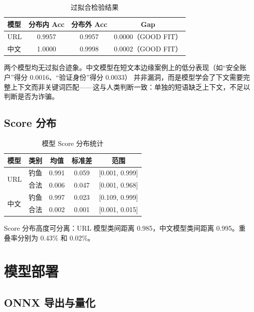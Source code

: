 \documentclass[11pt,a4paper]{article}
\begin{document}
\begin{table}[h]
\centering
\caption{过拟合检验结果}
\begin{tabular}{lccc}
\toprule
模型 & 分布内 Acc & 分布外 Acc & Gap \\
\midrule
URL & 0.9957 & 0.9957 & 0.0000（GOOD FIT） \\
中文 & 1.0000 & 0.9998 & 0.0002（GOOD FIT） \\
\bottomrule
\end{tabular}
\end{table}

两个模型均无过拟合迹象。中文模型在短文本边缘案例上的低分表现（如``安全账户''得分 0.0016、``验证身份''得分 0.0033）
并非漏洞，而是模型学会了下文需要完整上下文而非关键词匹配——这与人类判断一致：单独的短语缺乏上下文，不足以判断是否为诈骗。

\subsection{Score 分布}

\begin{table}[h]
\centering
\caption{模型 Score 分布统计}
\begin{tabular}{lcccc}
\toprule
模型 & 类别 & 均值 & 标准差 & 范围 \\
\midrule
\multirow{2}{*}{URL} & 钓鱼 & 0.991 & 0.059 & [0.001, 0.999] \\
 & 合法 & 0.006 & 0.047 & [0.001, 0.968] \\
\midrule
\multirow{2}{*}{中文} & 钓鱼 & 0.997 & 0.023 & [0.109, 0.999] \\
 & 合法 & 0.002 & 0.001 & [0.001, 0.015] \\
\bottomrule
\end{tabular}
\end{table}

Score 分布高度可分离：URL 模型类间距离 0.985，中文模型类间距离 0.995。重叠率分别为 0.43\% 和 0.02\%。

\section{模型部署}

\subsection{ONNX 导出与量化}
\end{document}
